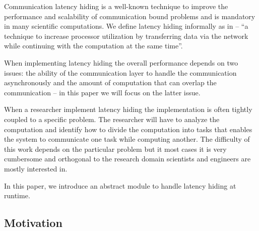 \documentclass{acm_proc_article-sp}
\begin{document}
Communication latency hiding is a well-known technique to improve the performance and scalability of communication bound problems and is mandatory in many scientific computations. We define latency hiding informally as in \cite{Strumpen94latencyhiding} -- ``a technique to increase processor utilization by transferring data via the network while continuing with the computation at the same time''.

When implementing latency hiding the overall performance depends on two issues: the ability of the communication layer to handle the communication asynchronously and the amount of computation that can overlap the communication -- in this paper we will focus on the latter issue.

When a researcher implement latency hiding the implementation is often tightly coupled to a specific problem. The researcher will have to analyze the computation and identify how to divide the computation into tasks that enables the system to communicate one task while computing another. The difficulty of this work depends on the particular problem but it most cases it is very cumbersome and orthogonal to the research domain scientists and engineers are mostly interested in.

In this paper, we introduce an abstract module to handle latency hiding at runtime.



\subsection{Motivation}
\end{document}
